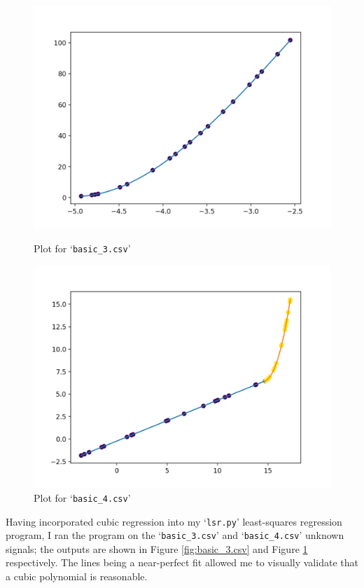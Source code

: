 \documentclass[onecolumn, 12pt, a4paper]{article}
\begin{document}
\begin{figure}[htbp]
\centering
\begin{minipage}[b]{.49\textwidth}
    \includegraphics[width=\textwidth]{images/basic_3.png}
    \caption{Plot for `\texttt{basic\_3.csv}'}
    \label{fig:basic_3.csv}
\end{minipage}
\hfill
\begin{minipage}[b]{.49\textwidth}
    \includegraphics[width=\textwidth]{images/basic_4.png}
    \caption{Plot for `\texttt{basic\_4.csv}'}
    \label{fig:basic_4.csv}
\end{minipage}
\end{figure}

Having incorporated cubic regression into my `\texttt{lsr.py}'
least-squares regression program, I ran the program on
the `\texttt{basic\_3.csv}' and `\texttt{basic\_4.csv}'
unknown signals;
the outputs are shown in Figure \ref{fig:basic_3.csv}
and Figure \ref{fig:basic_4.csv} respectively.
The lines being a near-perfect fit allowed me to
visually validate that a cubic polynomial is reasonable.
\end{document}
